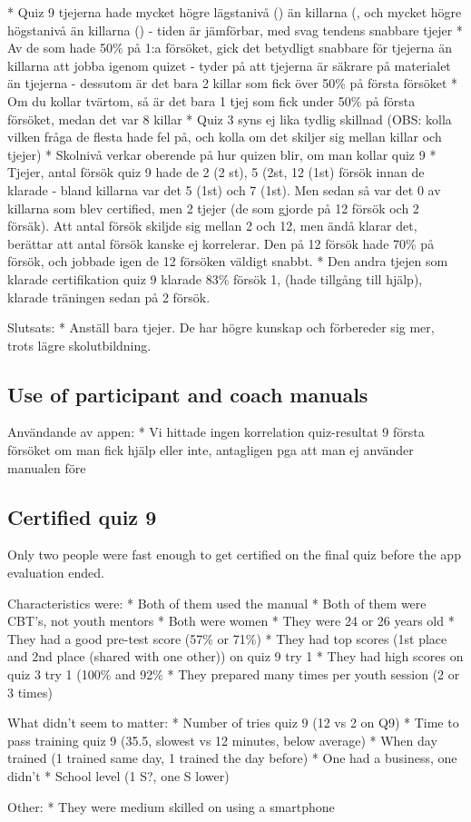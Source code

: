 * Quiz 9 tjejerna hade mycket högre lägstanivå () än killarna (, och mycket högre högstanivå än killarna () - tiden är jämförbar, med svag tendens snabbare tjejer
* Av de som hade 50\% på 1:a försöket, gick det betydligt snabbare för tjejerna än killarna att jobba igenom quizet - tyder på att tjejerna är säkrare på materialet än tjejerna - dessutom är det bara 2 killar som fick över 50\% på första försöket
* Om du kollar tvärtom, så är det bara 1 tjej som fick under 50\% på första försöket, medan det var 8 killar
* Quiz 3 syns ej lika tydlig skillnad (OBS: kolla vilken fråga de flesta hade fel på, och kolla om det skiljer sig mellan killar och tjejer)
* Skolnivå verkar oberende på hur quizen blir, om man kollar quiz 9
* Tjejer, antal försök quiz 9 hade de 2 (2 st), 5 (2st, 12 (1st) försök innan de klarade - bland killarna var det 5 (1st) och 7 (1st). Men sedan så var det 0 av killarna som blev certified, men 2 tjejer (de som gjorde på 12 försök och 2 försäk). Att antal försök skiljde sig mellan 2 och 12, men ändå klarar det, berättar att antal försök kanske ej korrelerar. Den på 12 försök hade 70\% på försök, och jobbade igen de 12 försöken väldigt snabbt.
* Den andra tjejen som klarade certifikation quiz 9 klarade 83\% försök 1, (hade tillgång till hjälp), klarade träningen sedan på 2 försök.

Slutsats:
* Anställ bara tjejer. De har högre kunskap och förbereder sig mer, trots lägre skolutbildning.

\subsection{Use of participant and coach manuals}

Användande av appen:
* Vi hittade ingen korrelation quiz-resultat 9 första försöket om man fick hjälp eller inte, antagligen pga att man ej använder manualen före

\subsection{Certified quiz 9}
Only two people were fast enough to get certified on the final quiz before the app evaluation ended. 

Characteristics were:
* Both of them used the manual
* Both of them were CBT's, not youth mentors
* Both were women
* They were 24 or 26 years old
* They had a good pre-test score (57\% or 71\%)
* They had top scores (1st place and 2nd place (shared with one other)) on quiz 9 try 1
* They had high scores on quiz 3 try 1 (100\% and 92\%
* They prepared many times per youth session (2 or 3 times)

What didn't seem to matter:
* Number of tries quiz 9 (12 vs 2 on Q9)
* Time to pass training quiz 9 (35.5, slowest vs 12 minutes, below average)
* When day trained (1 trained same day, 1 trained the day before)
* One had a business, one didn't
* School level (1 S?, one S lower)

Other:
* They were medium skilled on using a smartphone
